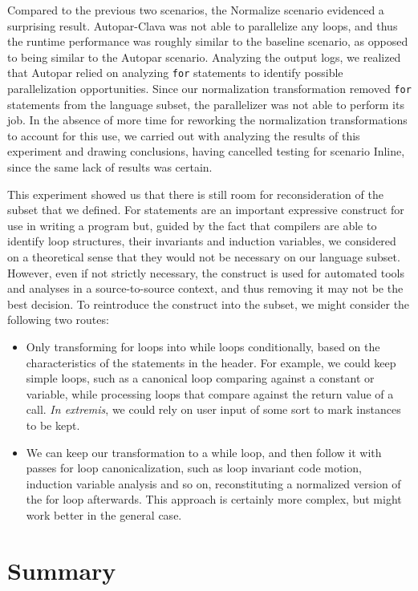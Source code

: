 Compared to the previous two scenarios, the Normalize scenario evidenced a surprising result. Autopar-Clava was not able to parallelize any loops, and thus the runtime performance was roughly similar to the baseline scenario, as opposed to being similar to the Autopar scenario. Analyzing the output logs, we realized that Autopar relied on analyzing \texttt{for} statements to identify possible parallelization opportunities. Since our normalization transformation removed \texttt{for} statements from the language subset, the parallelizer was not able to perform its job. In the absence of more time for reworking the normalization transformations to account for this use, we carried out with analyzing the results of this experiment and drawing conclusions, having cancelled testing for scenario Inline, since the same lack of results was certain.

This experiment showed us that there is still room for reconsideration of the subset that we defined. For statements are an important expressive construct for use in writing a program but, guided by the fact that compilers are able to identify loop structures, their invariants and induction variables, we considered on a theoretical sense that they would not be necessary on our language subset. However, even if not strictly necessary, the construct is used for automated tools and analyses in a source-to-source context, and thus removing it may not be the best decision. To reintroduce the construct into the subset, we might consider the following two routes:

\begin{itemize}
    \item Only transforming for loops into while loops conditionally, based on the characteristics of the statements in the header. For example, we could keep simple loops, such as a canonical loop comparing against a constant or variable, while processing loops that compare against the return value of a call. \textit{In extremis}, we could rely on user input of some sort to mark instances to be kept.
    \item We can keep our transformation to a while loop, and then follow it with passes for loop canonicalization, such as loop invariant code motion, induction variable analysis and so on, reconstituting a normalized version of the for loop afterwards. This approach is certainly more complex, but might work better in the general case.
\end{itemize}

\section{Summary}

